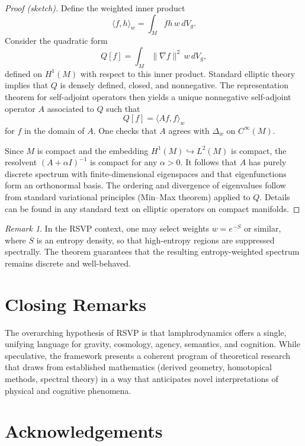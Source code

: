 \documentclass[12pt]{article}
\theoremstyle{plain}
\theoremstyle{definition}
\theoremstyle{remark}
\newtheorem{remark}[theorem]{Remark}
\begin{document}
\begin{proof}[Proof (sketch)]
Define the weighted inner product
\[
    \langle f, h\rangle_w = \int_M f h\,w\, dV_g.
\]
Consider the quadratic form
\[
    Q[f] = \int_M \|\nabla f\|^2\, w\,dV_g,
\]
defined on $H^1(M)$ with respect to this inner product. Standard elliptic
theory implies that $Q$ is densely defined, closed, and nonnegative. The
representation theorem for self-adjoint operators then yields a unique
nonnegative self-adjoint operator $A$ associated to $Q$ such that
\[
    Q[f] = \langle Af, f\rangle_w
\]
for $f$ in the domain of $A$. One checks that $A$ agrees with $\Delta_w$ on
$C^\infty(M)$.

Since $M$ is compact and the embedding $H^1(M) \hookrightarrow L^2(M)$ is
compact, the resolvent $(A+\alpha I)^{-1}$ is compact for any $\alpha>0$.
It follows that $A$ has purely discrete spectrum with finite-dimensional
eigenspaces and that eigenfunctions form an orthonormal basis. The ordering
and divergence of eigenvalues follow from standard variational principles
(Min--Max theorem) applied to $Q$. Details can be found in any standard text
on elliptic operators on compact manifolds.
\end{proof}

\begin{remark}
In the RSVP context, one may select weights $w = e^{-S}$ or similar, where
$S$ is an entropy density, so that high-entropy regions are suppressed
spectrally. The theorem guarantees that the resulting entropy-weighted
spectrum remains discrete and well-behaved.
\end{remark}


\section{Closing Remarks}

The overarching hypothesis of RSVP is that lamphrodynamics offers a single,
unifying language for gravity, cosmology, agency, semantics, and cognition.
While speculative, the framework presents a coherent program of theoretical
research that draws from established mathematics (derived geometry,
homotopical methods, spectral theory) in a way that anticipates novel
interpretations of physical and cognitive phenomena.


\section*{Acknowledgements}
\end{document}
